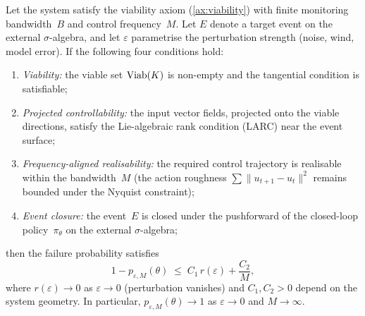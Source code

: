 \begin{proposition}\label{prop:event-lock}
Let the system satisfy the viability axiom (\cref{ax:viability})
with finite monitoring bandwidth~$B$ and control frequency~$M$.
Let $E$ denote a target event on the external
$\sigma$-algebra, and let $\varepsilon$ parametrise the
perturbation strength (noise, wind, model error).  If the
following four conditions hold:
\begin{enumerate}[label=(\roman*),nosep]
  \item \emph{Viability:} the viable set $\mathrm{Viab}(K)$ is
  non-empty and the tangential condition is satisfiable;
  \item \emph{Projected controllability:} the input vector
  fields, projected onto the viable directions, satisfy the
  Lie-algebraic rank condition (LARC) near the event surface;
  \item \emph{Frequency-aligned realisability:} the required
  control trajectory is realisable within the bandwidth~$M$
  (the action roughness $\sum \|u_{t+1} - u_t\|^2$ remains
  bounded under the Nyquist constraint);
  \item \emph{Event closure:} the event~$E$ is closed under
  the pushforward of the closed-loop policy~$\pi_\theta$
  on the external $\sigma$-algebra;
\end{enumerate}
then the failure probability satisfies
\begin{equation}\label{eq:event-lock}
  1 - p_{\varepsilon,M}(\theta)
  \;\leq\;
  C_1\,r(\varepsilon) + \frac{C_2}{M},
\end{equation}
where $r(\varepsilon) \to 0$ as $\varepsilon \to 0$
(perturbation vanishes) and $C_1, C_2 > 0$ depend on the
system geometry.  In particular,
$p_{\varepsilon,M}(\theta) \to 1$ as $\varepsilon \to 0$
and $M \to \infty$.
\end{proposition}

